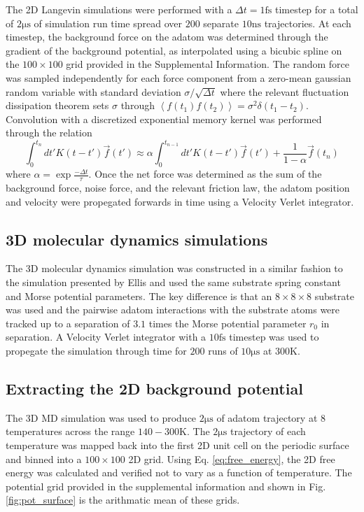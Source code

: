\documentclass[7pt]{article}
\newcommand{\ns}{\si{\nano\second}}
\newcommand{\fs}{\si{\femto\second}}
\newcommand{\us}{\si{\micro\second}}
\newcommand{\K}{\si{\kelvin}}
\begin{document}
The 2D Langevin simulations were performed with a $\Delta{t} = 1\fs$ timestep for a total of $2\us$ of simulation run time spread over $200$ separate $10\ns$ trajectories. At each timestep, the background force on the adatom was determined through the gradient of the background potential, as interpolated using a bicubic spline on the $100\times100$ grid provided in the Supplemental Information. The random force was sampled independently for each force component from a zero-mean gaussian random variable with standard deviation $\sigma/\sqrt{\Delta{t}}$ where the relevant fluctuation dissipation theorem sets $\sigma$ through $\left<f\left(t_1\right)f\left(t_2\right)\right>=\sigma^2\delta\left(t_1-t_2\right)$. Convolution with a discretized exponential memory kernel was performed through the relation
$$
\int_0^{t_n} dt' K\left(t-t'\right) \vec{f}(t') \approx \alpha \int_0^{t_{n-1}} dt' K\left(t-t'\right) \vec{f}(t') + \frac{1}{1-\alpha} \vec{f}\left(t_n\right)
$$
where $\alpha = \exp{\frac{-\Delta{t}}{\tau}}$. Once the net force was determined as the sum of the background force, noise force, and the relevant friction law, the adatom position and velocity were propegated forwards in time using a Velocity Verlet integrator.

\subsection*{3D molecular dynamics simulations}

The 3D molecular dynamics simulation was constructed in a similar fashion to the simulation presented by Ellis\cite{Ellis} and used the same substrate spring constant and Morse potential parameters. The key difference is that an $8\times8\times8$ substrate was used and the pairwise adatom interactions with the substrate atoms were tracked up to a separation of $3.1$ times the Morse potential parameter $r_0$ in separation. A Velocity Verlet integrator with a $10\fs$ timestep was used to propegate the simulation through time for $200$ runs of $10\us$ at $300\K$.

\subsection*{Extracting the 2D background potential}

The 3D MD simulation was used to produce $2\us$ of adatom trajectory at 8 temperatures across the range $140-300\K$. The $2\us$ trajectory of each temperature was mapped back into the first 2D unit cell on the periodic surface and binned into a $100\times100$ 2D grid. Using Eq. \ref{eq:free_energy}, the 2D free energy was calculated and verified not to vary as a function of temperature. The potential grid provided in the supplemental information and shown in Fig. \ref{fig:pot_surface} is the arithmatic mean of these grids.
\end{document}
